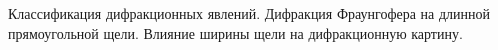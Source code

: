\documentclass[__main__.tex]{subfiles}
\begin{document}
Классификация дифракционных явлений. Дифракция Фраунгофера на длинной прямоугольной щели. Влияние ширины щели на дифракционную картину.\\ 

\end{document}
